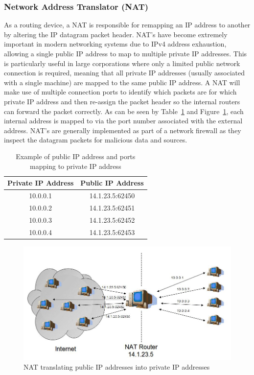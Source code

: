 \documentclass[a4paper, titlepage]{article}
\begin{document}
\subsubsection{Network Address Translator (NAT)}
As a routing device, a NAT is responsible for remapping an IP address to another by altering the IP datagram packet header. NAT's have become extremely important in modern networking systems due to IPv4 address exhaustion, allowing a single public IP address to map to multiple private IP addresses. This is particularly useful in large corporations where only a limited public network connection is required, meaning that all private IP addresses (usually associated with a single machine) are mapped to the same public IP address. A NAT will make use of multiple connection ports to identify which packets are for which private IP address and then re-assign the packet header so the internal routers can forward the packet correctly. As can be seen by Table~\ref{tab:ip} and Figure~\ref{fig:nat}, each internal address is mapped to via the port number associated with the external address. NAT's are generally implemented as part of a network firewall as they inspect the datagram packets for malicious data and sources.

\begin{table}[H]
	\centering
	\begin{tabular} { | c | c | }
		\hline
		\textbf{Private IP Address} & \textbf{Public IP Address} \\
		\hline
		10.0.0.1 & 14.1.23.5:62450 \\
		\hline
		10.0.0.2 & 14.1.23.5:62451 \\
		\hline
		10.0.0.3 & 14.1.23.5:62452 \\
		\hline
		10.0.0.4 & 14.1.23.5:62453 \\
		\hline
	\end{tabular}
	\caption{Example of public IP address and ports mapping to private IP address}
	\label{tab:ip}
\end{table}

\begin{figure}[H]
	\centering
	\includegraphics[width=\textwidth]{images/nat.jpg}
	\caption{NAT translating public IP addresses into private IP addresses}
	\label{fig:nat}
\end{figure}
\end{document}
